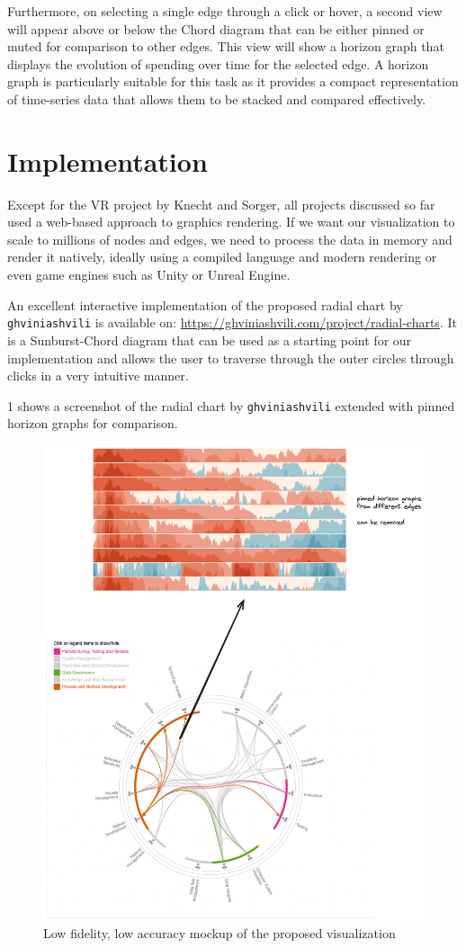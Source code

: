 \documentclass{vgtc}
\begin{document}
Furthermore, on selecting a single edge through a click or hover, a second view will appear above or below the Chord diagram that can be either pinned or muted for comparison to other edges. This view will show a horizon graph that displays the evolution of spending over time for the selected edge. A horizon graph is particularly suitable for this task as it provides a compact representation of time-series data that allows them to be stacked and compared effectively.

\section{Implementation} %

Except for the VR project by Knecht and Sorger, all projects discussed so far used a web-based approach to graphics rendering. If we want our visualization to scale to millions of nodes and edges, we need to process the data in memory and render it natively, ideally using a compiled language and modern rendering or even game engines such as Unity or Unreal Engine.

An excellent interactive implementation of the proposed radial chart by \texttt{ghviniashvili} is available on: \url{https://ghviniashvili.com/project/radial-charts}. It is a Sunburst-Chord diagram that can be used as a starting point for our implementation and allows the user to traverse through the outer circles through clicks in a very intuitive manner.

\figurename{1} shows a screenshot of the radial chart by \texttt{ghviniashvili} extended with pinned horizon graphs for comparison.
\begin{figure}[h]
    \centering
    \includegraphics[width=0.8\linewidth]{proposal.png}
    \caption{Low fidelity, low accuracy mockup of the proposed visualization}
\end{figure}
\end{document}
